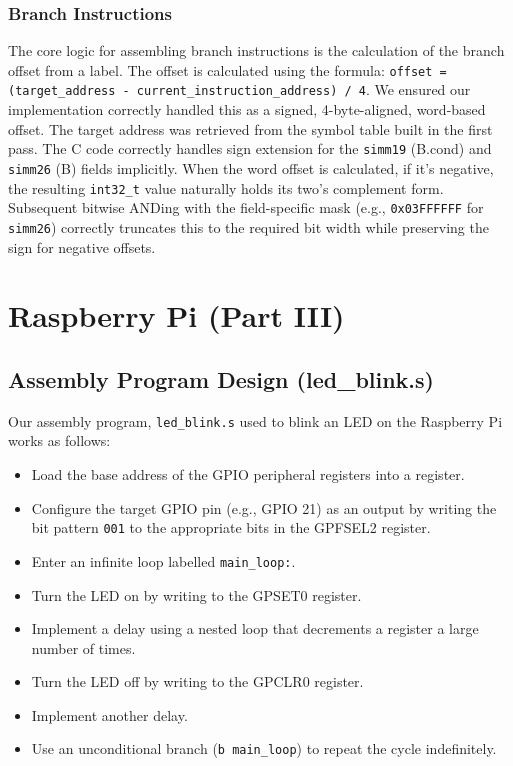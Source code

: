 \documentclass[11pt]{article}
\begin{document}
\subsubsection{Branch Instructions}
The core logic for assembling branch instructions is the calculation of the branch offset from a label. The offset is calculated using the formula: \texttt{offset = (target\_address - current\_instruction\_address) / 4}. We ensured our implementation correctly handled this as a signed, 4-byte-aligned, word-based offset. The target address was retrieved from the symbol table built in the first pass. 
The C code correctly handles sign extension for the \texttt{simm19} (B.cond) and \texttt{simm26} (B) fields implicitly. When the word offset is calculated, if it's negative, the resulting \texttt{int32\_t} value naturally holds its two's complement form. Subsequent bitwise ANDing with the field-specific mask (e.g., \texttt{0x03FFFFFF} for \texttt{simm26}) correctly truncates this to the required bit width while preserving the sign for negative offsets.

\section{Raspberry Pi (Part III)}

\subsection{Assembly Program Design (led\_blink.s)}
Our assembly program, \texttt{led\_blink.s} used to blink an LED on the Raspberry Pi works as follows:
\begin{itemize}
    \item Load the base address of the GPIO peripheral registers into a register.
    \item Configure the target GPIO pin (e.g., GPIO 21) as an output by writing the bit pattern \texttt{001} to the appropriate bits in the GPFSEL2 register.
    \item Enter an infinite loop labelled \texttt{main\_loop:}.
    \item Turn the LED on by writing to the GPSET0 register.
    \item Implement a delay using a nested loop that decrements a register a large number of times.
    \item Turn the LED off by writing to the GPCLR0 register.
    \item Implement another delay.
    \item Use an unconditional branch (\texttt{b main\_loop}) to repeat the cycle indefinitely.
\end{itemize}
\end{document}
